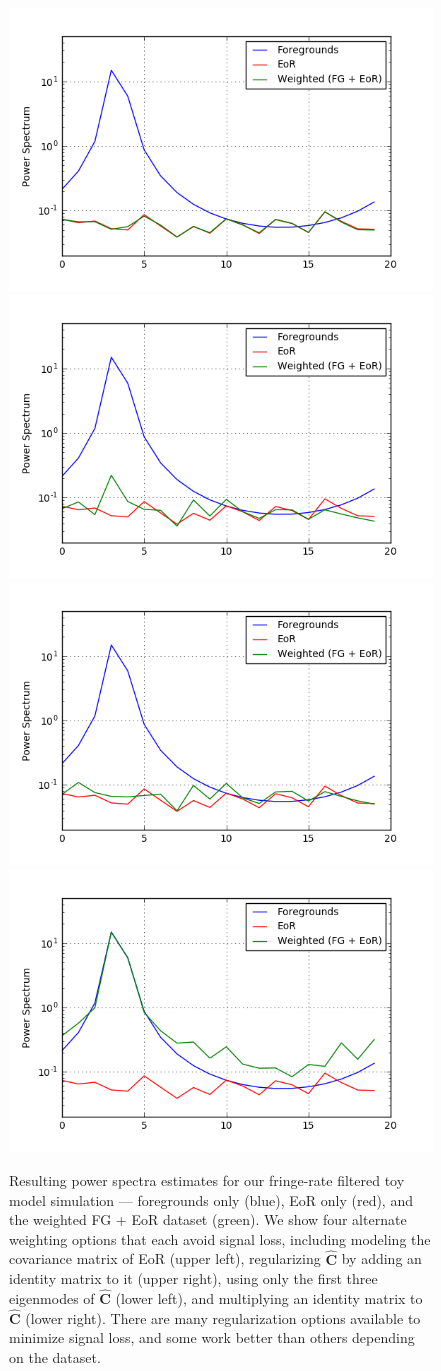 \documentclass[preprint2,numberedappendix,tighten]{aastex6}  %
\begin{document}
\begin{figure}
	\centering
	\includegraphics[trim={0.4cm 0.8cm 1.3cm 1cm},clip,height=0.25\textwidth]{plots/toy_sigloss10.png}
	\includegraphics[trim={1cm 0.8cm 1.3cm 1cm},clip,height=0.25\textwidth]{plots/toy_sigloss8.png}
	\includegraphics[trim={0.4cm 0.8cm 1.3cm 1cm},clip,height=0.25\textwidth]{plots/toy_sigloss9.png}
	\includegraphics[trim={1cm 0.8cm 1.3cm 1cm},clip,height=0.25\textwidth]{plots/toy_sigloss11.png}
	\caption{Resulting power spectra estimates for our fringe-rate filtered toy model simulation --- foregrounds only (blue), EoR only (red), and the weighted FG + EoR dataset (green). We show four alternate weighting options that each avoid signal loss, including modeling the covariance matrix of EoR (upper left), regularizing $\hat{\textbf{C}}$ by adding an identity matrix to it (upper right), using only the first three eigenmodes of $\hat{\textbf{C}}$ (lower left), and multiplying an identity matrix to $\hat{\textbf{C}}$ (lower right). There are many regularization options available to minimize signal loss, and some work better than others depending on the dataset.}
	\label{fig:toy_sigloss8}
\end{figure}
\end{document}
